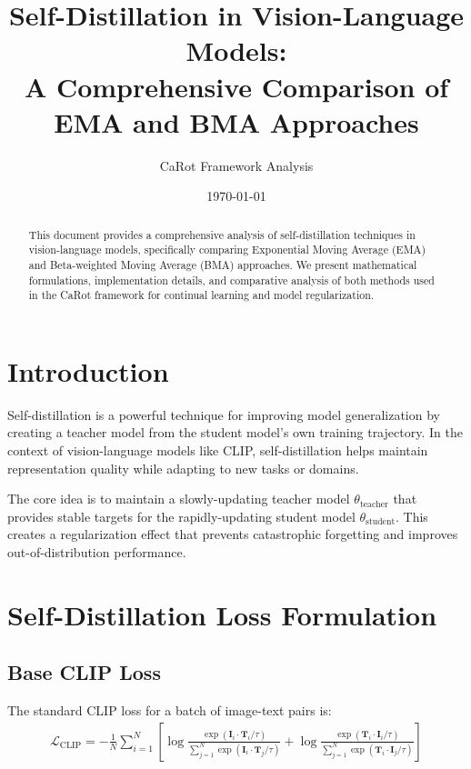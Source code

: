 \documentclass[11pt]{article}
\title{Self-Distillation in Vision-Language Models: \\ A Comprehensive Comparison of EMA and BMA Approaches}
\author{CaRot Framework Analysis}
\date{\today}
\begin{document}
\maketitle

\begin{abstract}
This document provides a comprehensive analysis of self-distillation techniques in vision-language models, specifically comparing Exponential Moving Average (EMA) and Beta-weighted Moving Average (BMA) approaches. We present mathematical formulations, implementation details, and comparative analysis of both methods used in the CaRot framework for continual learning and model regularization.
\end{abstract}

\section{Introduction}

Self-distillation is a powerful technique for improving model generalization by creating a teacher model from the student model's own training trajectory. In the context of vision-language models like CLIP, self-distillation helps maintain representation quality while adapting to new tasks or domains.

The core idea is to maintain a slowly-updating teacher model $\theta_{\text{teacher}}$ that provides stable targets for the rapidly-updating student model $\theta_{\text{student}}$. This creates a regularization effect that prevents catastrophic forgetting and improves out-of-distribution performance.

\section{Self-Distillation Loss Formulation}

\subsection{Base CLIP Loss}

The standard CLIP loss for a batch of image-text pairs is:
\begin{align}
\mathcal{L}_{\text{CLIP}} = -\frac{1}{N} \sum_{i=1}^{N} \left[ \log \frac{\exp(\mathbf{I}_i \cdot \mathbf{T}_i / \tau)}{\sum_{j=1}^{N} \exp(\mathbf{I}_i \cdot \mathbf{T}_j / \tau)} + \log \frac{\exp(\mathbf{T}_i \cdot \mathbf{I}_i / \tau)}{\sum_{j=1}^{N} \exp(\mathbf{T}_i \cdot \mathbf{I}_j / \tau)} \right]
\end{align}
\end{document}
